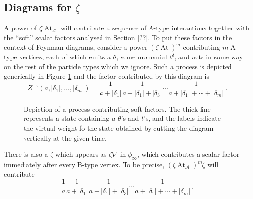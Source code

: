 \documentclass[english,letter paper,12pt,leqno]{article}
\theoremstyle{example}
\numberwithin{equation}{section}
\def\AA{\mathcal{A}}
\def\be{\begin{equation}}
\def\ee{\end{equation}}
\DeclareMathOperator{\vAt}{At}
\begin{document}
\subsection{Diagrams for $\zeta$}\label{section:fenyman_diagram_2}

A power of $\zeta \vAt_{\AA}$ will contribute a sequence of A-type interactions together with the ``soft'' scalar factors analysed in Section \ref{??}. To put these factors in the context of Feynman diagrams, consider a power $(\zeta \vAt)^m$ contributing $m$ A-type vertices, each of which emits a $\theta$, some monomial $t^\delta$, and acts in some way on the rest of the particle types which we ignore. Such a process is depicted generically in Figure \ref{fig:tapesofU} and the factor contributed by this diagram is
\be\label{eq:diagram_for_zeta_eq}
Z^{\,\rightarrow}(a,|\delta_1|,\ldots,|\delta_m|) = \frac{1}{a + |\delta_1|} \frac{1}{a + |\delta_1| + |\delta_3|} \cdots \frac{1}{a + |\delta_1| + \cdots + |\delta_m|}\,.
\ee

\begin{figure}
\centering
\caption{Depiction of a process contributing soft factors. The thick line represents a state containing $a$ $\theta$'s and $t$'s, and the labels indicate the virtual weight fo the state obtained by cutting the diagram vertically at the given time.}\label{fig:tapesofU}
\end{figure}

There is also a $\zeta$ which appears as $\zeta \nabla$ in $\phi_\infty$, which contributes a scalar factor immediately after every B-type vertex. To be precise, $(\zeta \vAt_{\AA})^m \zeta$ will contribute
\be\label{eq:diagram_for_zeta_eq_b}
\frac{1}{a} \frac{1}{a + |\delta_1|} \frac{1}{a + |\delta_1| + |\delta_3|} \cdots \frac{1}{a + |\delta_1| + \cdots + |\delta_m|}\,.
\ee
\end{document}
